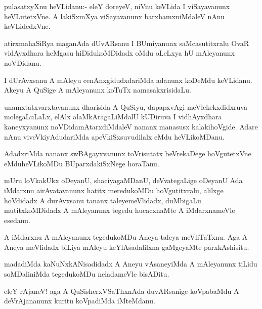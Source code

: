 \documentclass{article}
\begin{document}
\begin{mn}
pulasatxyXnu heVLidanu:- eleY doreyeV, niVnu keVLida I viSayavanunx
heVLutetxVne. A lakiSxmXya viSayavanunx barxhamxniMdaleV nAnu keVLidedxVne.
\end{mn}

\begin{mn}
atirxmahaSiRya maganAda dUvARsanu I BUmiyanunx saMcasutitxralu OvaR
vidAyxdhara heMgasu hiDidukoMDidadx oMdu oLeLxya hU mAleyanunx noVDidanu.
\end{mn}

\begin{mn}
I dUrAvxsanu A mAleyu cenAnxgidudxdariMda adanunx koDeMdu
keVLidanu. Akeyu A QuSige A mAleyanunx koTuTx namasakxrisidaLu.
\end{mn}

\begin{mn}
unamxtatxvarxtavanunx dharisida A QuSiyu, dapapxvAgi meVlekekxdidxruva
molegaLuLaLx, elAlx alaMkAragaLiMdalU kUDiruva I vidhAyxdhara
kaneyxyanunx noVDidamAtarxdiMdaleV nananx manasusx
kalakihoVgide. Adare nAnu viveVkiyAdudariMda apeVkiSxsuvudilalx eMdu heVLikoMDanu.
\end{mn}

\begin{mn}%
AdadxriMda nananx swBAgayxvanunx toVrisutatx beVrekaDege hoVgutetxVne
eMduheVLikoMDu BUparxdakiSxNege horaTanu.
\end{mn}

\begin{mn}%
mUru loVkakUkx oDeyanU, shaciyagaMDanU, deVvategaLige oDeyanU Ada
iMdarxnu airAvatavanunx hatitx meredukoMDu hoVgutitxralu, alilxge
hoVdidadx A durAvxsanu tananx taleyemeVlidadx, duMbigaLu
mutitxkoMDidadx A mAleyanunx tegedu hucacxnaMte A iMdarxnameVle esedanu.
\end{mn}

\begin{mn}
A iMdarxnu A mAleyanunx tegedukoMDu Aneya taleya meVliTaTxnu. Aga A
Aneya meVlidadx biLiya mAleyu keYlAsadalilxna gaMgeyaMte parxkAshisitu.
\end{mn}

\begin{mn}
madadiMda kaNuNxkANisadidadx A Aneyu vAsaneyiMda A mAleyanunx tiLidu
soMDaliniMda tegedukoMDu neladameVle bisADitu.
\end{mn}

\begin{mn}%
eleY rAjaneV! aga A QuSisherxVSaThxnAda duvARsanige koVpabaMdu A
deVrAjananunx kuritu koVpadiMda iMteMdanu.
\end{mn}
\end{document}
